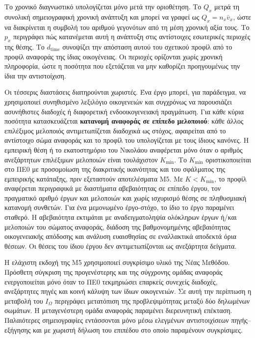 \documentclass[11pt,a4paper]{article}
\begin{document}
\begin{enumerate}[label=\textbf{\arabic*.},leftmargin=2.2em]
Το χρονικό διαγνωστικό υπολογίζεται μόνο μετά την οριοθέτηση. Το $Q_x$ μετρά τη συνολική σημειογραφική χρονική ανάπτυξη και μπορεί να γραφεί ως $Q_x=n_x\bar v_x$, ώστε να διακρίνεται η συμβολή του αριθμού γεγονότων από τη μέση χρονική αξία τους. Το $p_x$ περιγράφει πώς κατανέμεται αυτή η ανάπτυξη στις αντίστοιχες εσωτερικές περιοχές της θέσης. Το $d_{\mathrm{time}}$ συνοψίζει την απόσταση αυτού του σχετικού προφίλ από το προφίλ αναφοράς της ίδιας οικογένειας. Οι περιοχές ορίζονται χωρίς χρονική πληροφορία, ώστε η ποσότητα που εξετάζεται να μην καθορίζει προηγουμένως την ίδια την αντιστοίχιση.
\end{enumerate}

Οι τέσσερις διαστάσεις διατηρούνται χωριστές. Ένα έργο μπορεί, για παράδειγμα, να χρησιμοποιεί συνηθισμένο λεξιλόγιο οικογενειών και συγχρόνως να παρουσιάζει ασυνήθιστες διαδοχές ή διαφορετική ενδοοικογενειακή πραγμάτωση. Για κάθε κύρια ποσότητα κατασκευάζεται \textbf{κατανομή αναφοράς σε επίπεδο μελοποιού}: κάθε άλλος επιλέξιμος μελοποιός αντιμετωπίζεται διαδοχικά ως στόχος, αφαιρείται από το αντίστοιχο σώμα αναφοράς και το προφίλ του υπολογίζεται με τους ίδιους κανόνες. Η εμπειρική θέση ή το εκατοστημόριο του Νικολάου αναφέρεται μόνο όταν ο αριθμός ανεξάρτητων επιλέξιμων μελοποιών είναι τουλάχιστον $K_{\min}$. Το $K_{\min}$ οριστικοποιείται στο ΠΕ0 με προσομοίωση της διακριτικής ικανότητας και του σφάλματος της εμπειρικής κατάταξης, πριν εξεταστούν αποτελέσματα M5. Με $K<K_{\min}$, το προφίλ αναφέρεται περιγραφικά με διαστήματα αβεβαιότητας σε επίπεδο έργου, τον πραγματικό αριθμό έργων και μελοποιών και χωρίς ισχυρισμό θέσης σε πληθυσμιακή κατανομή συνθετών. Για ένα μεμονωμένο έργο-στόχο, το ίδιο το έργο παραμένει σταθερό. Η αβεβαιότητα εκτιμάται με αναδειγματοληψία ολόκληρων έργων ή/και μελοποιών του σώματος αναφοράς, διάδοση της βαθμονομημένης αβεβαιότητας οικογενειακής απόδοσης και ανάλυση ευαισθησίας σε εναλλακτικά αποδεκτά όρια θέσεων. Οι θέσεις του ίδιου έργου δεν αντιμετωπίζονται ως ανεξάρτητα δείγματα.

Η ελάχιστη εκδοχή της M5 χρησιμοποιεί συγκρίσιμο υλικό της Νέας Μεθόδου. Πρόσθετη σύγκριση της προγενέστερης και της σύγχρονης ομάδας αναφοράς ενεργοποιείται μόνο όταν το ΠΕ0 τεκμηριώσει επαρκείς συνεχείς διαδοχές, ανεξάρτητες πηγές και κοινή κάλυψη των ίδιων οικογενειών. Σε αυτή την περίπτωση η μεταβολή του $I_{\Omega}$ περιγράφει μετατόπιση της προβλεψιμότητας μεταξύ δύο δηλωμένων σωμάτων. Η μεταγενέστερη ομάδα αναφοράς παραμένει διερευνητική επέκταση. Παλαιότερες σημειογραφίες εντάσσονται μόνο μέσω ελεγμένων αντιστοιχίσεων πηγής--εξήγησης και με χωριστή δήλωση του επιπέδου στο οποίο παραμένουν συγκρίσιμες.
\end{document}
